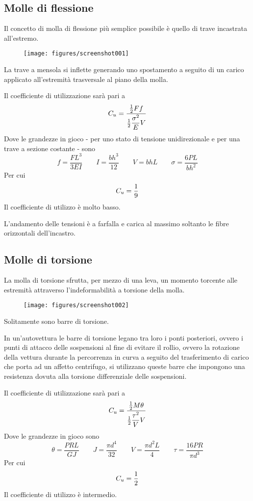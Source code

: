 \documentclass[a4paper, 15pt]{article}
\begin{document}
\subsection{Molle di flessione}
\begin{adjustwidth}{2in}{}	
	Il concetto di molla di flessione più semplice possibile è quello di trave incastrata all'estremo. 
	\begin{figure}[H]
		\centering
		\texttt{[image: figures/screenshot001]}
		\label{fig:screenshot001}
	\end{figure}
	La trave a mensola si inflette generando uno spostamento a seguito di un carico applicato all'estremità trasversale al piano della molla. \newline
	
	Il coefficiente di utilizzazione sarà pari a 
	\[C_u = \dfrac{{1\over2}Ff}{{1\over2}\dfrac{\sigma^2}{E}V}\]
	Dove le grandezze in gioco - per uno stato di tensione unidirezionale e per una trave a sezione costante - sono 
	\[f = \dfrac{FL^3}{3EI}\qquad I = \dfrac{bh^3}{12}\qquad V = bhL\qquad \sigma = \dfrac{6PL}{bh^2}\]
	Per cui
	\[C_u = {1\over9}\]
	Il coefficiente di utilizzo è molto basso. 
	
	L'andamento delle tensioni è a farfalla e carica al massimo soltanto le fibre orizzontali dell'incastro. 
\end{adjustwidth}
\newpage
\subsection{Molle di torsione}
\begin{adjustwidth}{2in}{}
	La molla di torsione sfrutta, per mezzo di una leva, un momento torcente alle estremità 	attraverso l'indeformabilità a torsione della molla. 
	\begin{figure}[H]
		\centering
		\texttt{[image: figures/screenshot002]}
		\label{fig:screenshot002}
	\end{figure}
	Solitamente sono barre di torsione. 
	
	In un'autovettura le barre di torsione legano tra loro i ponti posteriori, ovvero i punti di attacco delle sospensioni al fine di evitare il rollio, ovvero la rotazione della vettura durante la percorrenza in curva a seguito del trasferimento di carico che porta ad un affetto centrifugo, si utilizzano queste barre che impongono una resistenza dovuta alla torsione differenziale delle sospensioni. \newline 
	
	Il coefficiente di utilizzazione sarà pari a 
	\[C_u = \dfrac{{1\over2}M\theta}{{1\over2}\dfrac{\tau^2}{V}V}\]
	Dove le grandezze in gioco sono 
	\[\theta = \dfrac{PRL}{GJ}\qquad J = \dfrac{\pi d^4}{32}\qquad V = \dfrac{\pi d^2L}{4}\qquad \tau = \dfrac{16PR}{\pi d^3}\]
	Per cui
	\[C_u = {1\over2}\]
	Il coefficiente di utilizzo è intermedio. 
\end{adjustwidth}
\newpage
\end{document}
